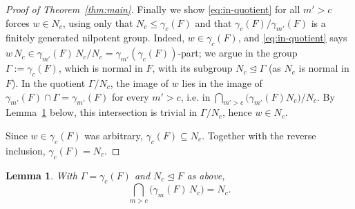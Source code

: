 \documentclass{amsart}
\newtheorem{lemma}{Lemma}
\theoremstyle{definition}
\theoremstyle{remark}
\begin{document}
\begin{proof}[Proof of Theorem~\ref{thm:main}]
Finally we show \eqref{eq:in-quotient} for all $m'>c$ forces $w\in N_c$, using only
that $N_c\le\gamma_c(F)$ and that $\gamma_c(F)/\gamma_{m'}(F)$ is a finitely
generated nilpotent group. Indeed, $w\in\gamma_c(F)$, and \eqref{eq:in-quotient}
says $w\,N_c\in\gamma_{m'}(F)\,N_c/N_c=\gamma_{m'}(\gamma_c(F))$-part; we argue in
the group $\Gamma:=\gamma_c(F)$, which is normal in $F$, with its subgroup
$N_c\trianglelefteq\Gamma$ (as $N_c$ is normal in $F$). In the quotient
$\Gamma/N_c$, the image of $w$ lies in the image of $\gamma_{m'}(F)\cap\Gamma=
\gamma_{m'}(F)$ for every $m'>c$, i.e. in
$\bigcap_{m'>c}\big(\gamma_{m'}(F)N_c\big)/N_c$. By
Lemma~\ref{lem:residual} below, this intersection is trivial in $\Gamma/N_c$, hence
$w\in N_c$.

Since $w\in\gamma_c(F)$ was arbitrary, $\gamma_c(F)\subseteq N_c$. Together with the
reverse inclusion, $\gamma_c(F)=N_c$.
\end{proof}

\begin{lemma}\label{lem:residual}
With $\Gamma=\gamma_c(F)$ and $N_c\trianglelefteq F$ as above,
\[
\bigcap_{m>c}\big(\gamma_m(F)\,N_c\big)=N_c .
\]
\end{lemma}
\end{document}
